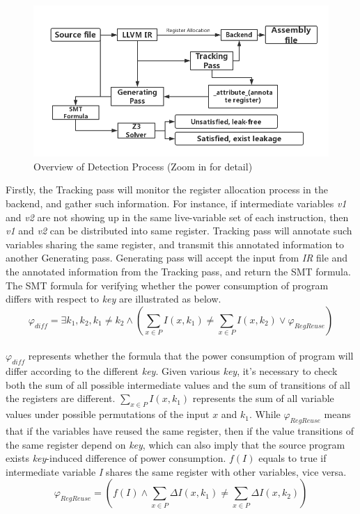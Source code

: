 \documentclass[10pt, conference]{IEEEtran}
\begin{document}
\begin{figure}[htbp]
\centerline{\includegraphics[totalheight=5.3cm]{detection.png}}
\caption{Overview of Detection Process (Zoom in for detail)}
\label{detection}
\end{figure}
Firstly, the Tracking pass will monitor the register allocation process in the backend, and gather such information. For instance, if intermediate variables \emph{v1} and \emph{v2} are not showing up in the same live-variable set of each instruction, then \emph{v1} and \emph{v2} can be distributed into same register. Tracking pass will annotate such variables sharing the same register, and transmit this annotated information to another Generating pass. Generating pass will accept the input from \emph{IR} file and the annotated information from the Tracking pass, and return the SMT formula. The SMT formula for verifying whether the power consumption of program differs with respect to \emph{key} are illustrated as below.\\
$${ \varphi  }_{ diff }=\exists { k }_{ 1 },{ k }_{ 2 }, { k }_{ 1 }\neq { k }_{ 2 }\wedge ( \sum _{ x\in P }{ I({ x },{ k }_{ 1 }) } \neq \sum _{ x\in P }{ I(x,{ k }_{ 2 }) } \vee {\varphi}_{RegReuse} ) $$ \\
${ \varphi  }_{ diff }$ represents whether the formula that the power consumption of program will differ according to the different \emph{key}. Given various \emph{key}, it's necessary to check both the sum of all possible intermediate values and the sum of transitions of all the registers are different. $\sum _{ x\in P }{ I(x,{ k }_{1}) } $ represents the sum of all variable values under possible permutations of the input $x$ and ${k}_{1}$. While ${\varphi}_{RegReuse}$ means that if the variables have reused the same register, then if the value transitions of the same register depend on \emph{key}, which can also imply that the source program exists \emph{key}-induced difference of power consumption. $f(I)$ equals to true if intermediate variable \emph{I} shares the same register with other variables, vice versa.
$${\varphi}_{RegReuse} = (f(I)\wedge \sum _{ x\in P }{ \Delta I(x,{ k }_{ 1 })\neq \sum _{ x\in P }{ \Delta I(x,{ k }_{ 2 }) }  } ) $$
\end{document}
